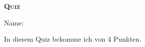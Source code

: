 \documentclass[a4,11pt]{article}
\begin{document}
{
\kopf
}
 \begin{center}
    {\Large {\bfseries\scshape Quiz}}
    \par \medskip
    \par \bigskip
    Name: \underline{\hspace{70mm}}
    \par \bigskip
    In diesem Quiz bekomme ich \underline{\hspace{25mm}} von 4 Punkten.
    \small
    \par \medskip
    
  \end{center}

\musterlsgfrage
\end{document}
